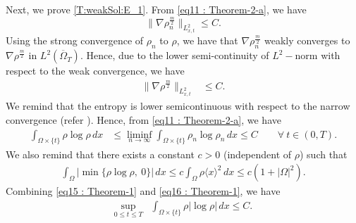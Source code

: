 \documentclass{amsart}
\numberwithin{equation}{section}
\newcommand{\abs}[1]{\left| #1 \right|}
\begin{document}
 Next, we prove \eqref{T:weakSol:E_1}.  From \eqref{eq11 : Theorem-2-a}, we have
\begin{equation*}\label{eq24 : Theorem-1}
\| \nabla \rho_n^{\frac{m}{2}}\|_{L_{x,t}^2} \leq C.
\end{equation*}
Using the strong convergence of $\rho_n$ to $\rho$, we have that $\nabla \rho_n^{\frac{m}{2}}$ weakly converges to $\nabla \rho^{\frac{m}{2}}$
 in $L^2(\overline{\Omega}_{T})$. Hence, due to the lower semi-continuity of $L^2-$norm with respect to the weak convergence,  we have
\begin{equation}\label{eq18 : Theorem-1}
\begin{aligned}
\|\nabla \rho^{\frac{m}{2}} \|_{L_{x,t}^{2}} %
& \leq C.
\end{aligned}
\end{equation}
 We remind that the entropy is lower semicontinuous with respect to the narrow convergence (refer \cite{ags:book}). %
  Hence, from \eqref{eq11 : Theorem-2-a}, we have
\begin{equation}\label{eq15 : Theorem-1}
\begin{aligned}
\int_{\Omega\times \{t\}} \rho  \log \rho \,dx
  &\leq \liminf_{n \rightarrow \infty} \int_{\Omega\times \{t\}} \rho_n  \log \rho_n  \,dx
  \leq C \qquad \forall ~ t\in (0,T).
\end{aligned}
\end{equation}
We also remind that there exists a constant $c>0$ (independent of $\rho$) such that
\begin{equation}\label{eq16 : Theorem-1}
\begin{aligned}
\int_{\Omega} | \min \{\rho \log \rho,~0 \} | \,dx \leq c \int_{\Omega}  \rho  \langle x \rangle^2  \, dx \leq c (1 + |\Omega|^2).
\end{aligned}
\end{equation}
Combining \eqref{eq15 : Theorem-1} and \eqref{eq16 : Theorem-1}, we have
\begin{equation}\label{eq20 : Theorem-1}
\begin{aligned}
\sup_{0\leq t \leq T} &\int_{\Omega\times \{t\}} \rho  \abs{\log \rho}  \,dx \leq  C.
\end{aligned}
\end{equation}
\end{document}
